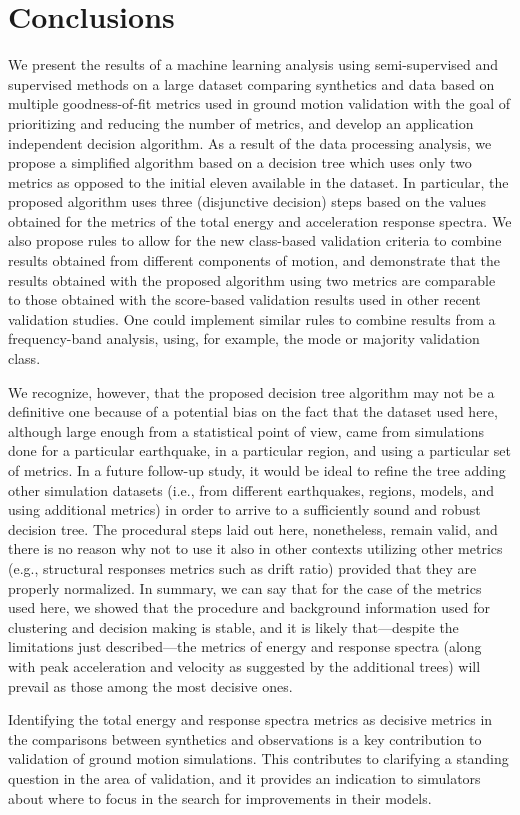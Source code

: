
\section{Conclusions}

We present the results of a machine learning analysis using semi-supervised and supervised methods on a large dataset comparing synthetics and data based on multiple goodness-of-fit metrics used in ground motion validation with the goal of prioritizing and reducing the number of metrics, and develop an application independent decision algorithm. As a result of the data processing analysis, we propose a simplified algorithm based on a decision tree which uses only two metrics as opposed to the initial eleven available in the dataset. In particular, the proposed algorithm uses three (disjunctive decision) steps based on the values obtained for the metrics of the total energy and acceleration response spectra. We also propose rules to allow for the new class-based validation criteria to combine results obtained from different components of motion, and demonstrate that the results obtained with the proposed algorithm using two metrics are comparable to those obtained with the score-based validation results used in other recent validation studies. One could implement similar rules to combine results from a frequency-band analysis, using, for example, the mode or majority validation class. 

We recognize, however, that the proposed decision tree algorithm may not be a definitive one because of a potential bias on the fact that the dataset used here, although large enough from a statistical point of view, came from simulations done for a particular earthquake, in a particular region, and using a particular set of metrics. In a future follow-up study, it would be ideal to refine the tree adding other simulation datasets (i.e., from different earthquakes, regions, models, and using additional metrics) in order to arrive to a sufficiently sound and robust decision tree. The procedural steps laid out here, nonetheless, remain valid, and there is no reason why not to use it also in other contexts utilizing other metrics (e.g., structural responses metrics such as drift ratio) provided that they are properly normalized. In summary, we can say that for the case of the metrics used here, we showed that the procedure and background information used for clustering and decision making is stable, and it is likely that---despite the limitations just described---the metrics of energy and response spectra (along with peak acceleration and velocity as suggested by the additional trees) will prevail as those among the most decisive ones.

Identifying the total energy and response spectra metrics as decisive metrics in the comparisons between synthetics and observations is a key contribution to validation of ground motion simulations. This contributes to clarifying a standing question in the area of validation, and it provides an indication to simulators about where to focus in the search for improvements in their models.
